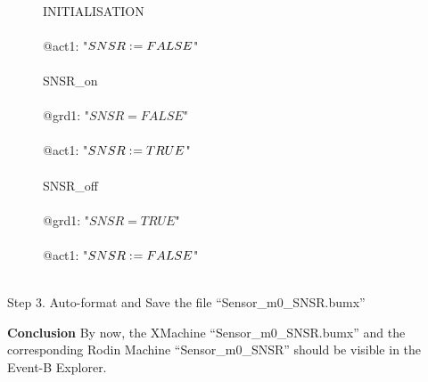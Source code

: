 \begin{description}
\begin{center}
\begin{Bcode}
		\Bevents\\
		\Btab INITIALISATION\\
		\Btab \Bbegin\\
		\Btab \Btab @act1: "\(SNSR \mathrel{:\mkern1mu=} FALSE\)"\\
		\Btab \Bend\\
		\Btab SNSR_on\\
		\Btab \Bwhen\\
		\Btab \Btab @grd1: "\(SNSR = FALSE\)"\\
		\Btab \Bthen\\
		\Btab \Btab @act1: "\(SNSR \mathrel{:\mkern1mu=} TRUE\)"\\
		\Btab \Bend\\
		\Btab SNSR_off\\
		\Btab \Bwhen\\
		\Btab \Btab @grd1: "\(SNSR = TRUE\)"\\
		\Btab \Bthen\\
		\Btab \Btab @act1: "\(SNSR \mathrel{:\mkern1mu=} FALSE\)"\\
		\Btab \Bend\\
		\Bend
		\fi
	\end{Bcode}
\end{center}

\item[Step 3. Auto-format and Save the file ``Sensor\_m0\_SNSR.bumx''] 
\end{description}

\textbf{Conclusion} By now, the XMachine ``Sensor\_m0\_SNSR.bumx'' and the corresponding Rodin Machine ``Sensor\_m0\_SNSR'' should be visible in the Event-B Explorer.

